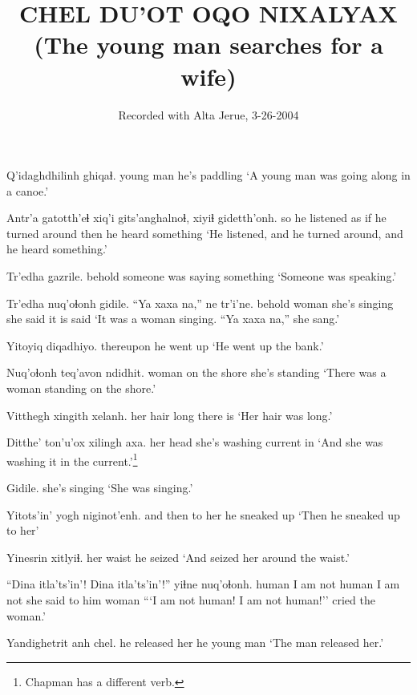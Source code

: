 \documentclass[12pt]{article}
\begin{document}
\title{CHEL DU'OT OQO NIXALYAX
\\(The young man searches for a wife)}

\author{Recorded with Alta Jerue, 3-26-2004}
\date{}

\maketitle

\gll Q'idaghdhilinh ghiqaɬ.
{young man} {he's paddling}
\glt `A young man was going along in a canoe.'
\glend

\gll Antr'a gatotth'eɬ xiq'i gits'anghalnoɬ, xiyiɬ gidetth'onh.
so  {he listened} {as if} {he turned around} then {he heard something}
\glt `He listened, and he turned around, and he heard something.'
\glend

\gll Tr'edha gazrile.
behold  {someone was saying something}
\glt `Someone was speaking.'
\glend

\gll Tr'edha nuq'oɬonh {gidile.} {``Ya xaxa na,''} ne  tr'i'ne.
behold  woman  {she's singing} {} {she said} {it is said}
\glt `It was a woman singing. ``Ya xaxa na,'' she sang.'
\glend

\gll Yitoyiq  diqadhiyo.
thereupon  {he went up}
\glt `He went up the bank.'
\glend

\gll Nuq'oɬonh teq'avon ndidhit.
woman {on the shore} {she's standing}
\glt `There was a woman standing on the shore.'
\glend

\gll Vitthegh xingith xelanh.
{her hair} long {there is}
\glt `Her hair was long.'
\glend

\gll Ditthe' ton'u'ox  xilingh axa.
{her head} {she's washing} current  in
\glt `And she was washing it in the current.'\footnote{Chapman has a different verb.}
\glend

\gll Gidile.
{{she's singing}}
\glt `She was singing.'
\glend

\gll Yitots'in' yogh niginot'enh.
{and then} {to her} {he sneaked up}
\glt `Then he sneaked up to her'
\glend

\gll Yinesrin xitlyiɬ.
{her waist} {he seized}
\glt `And seized her around the waist.'
\glend

\gll ``Dina itla'ts'in'! Dina  itla'ts'in'!'' yiɬne   nuq'oɬonh.
human {I am not}  human {I am not} {she said to him} {woman}
\glt ```I am not human! I am not human!'' cried the woman.'
\glend

\gll Yandighetrit anh chel.
{he released her} he {young man}
\glt `The man released her.'
\glend
\end{document}
